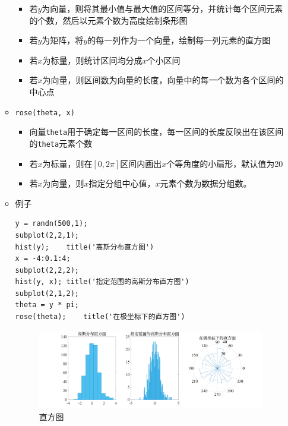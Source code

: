 \begin{enumerate}
\begin{itemize}
	\begin{itemize}
		\item 若$y$为向量，则将其最小值与最大值的区间等分，并统计每个区间元素的个数，然后以元素个数为高度绘制条形图
		\item 若$y$为矩阵，将$y$的每一列作为一个向量，绘制每一列元素的直方图
		\item 若$x$为标量，则统计区间均分成$x$个小区间
		\item 若$x$为向量，则区间数为向量的长度，向量中的每一个数为各个区间的中心点
	\end{itemize}
	\item \lstinline|rose(theta, x)|
		\begin{itemize}
		\item 向量\lstinline|theta|用于确定每一区间的长度，每一区间的长度反映出在该区间的\lstinline|theta|元素个数
		\item 若$x$为标量，则在$[0, 2\pi]$区间内画出$x$个等角度的小扇形，默认值为20
		\item 若$x$为向量，则$x$指定分组中心值，$x$元素个数为数据分组数。
	\end{itemize}
		\item 例子
	\begin{lstlisting}
y = randn(500,1);
subplot(2,2,1);	
hist(y);	title('高斯分布直方图')
x = -4:0.1:4;
subplot(2,2,2);	
hist(y, x);	title('指定范围的高斯分布直方图')
subplot(2,1,2);	
theta = y * pi;
rose(theta);	title('在极坐标下的直方图')
	\end{lstlisting}
	\begin{figure}[!htb]
		\centering
		\includegraphics[width=\linewidth]{pic/直方图.pdf}
		\caption{直方图}
	\end{figure}
\end{itemize}
\end{enumerate}

\newpage 

